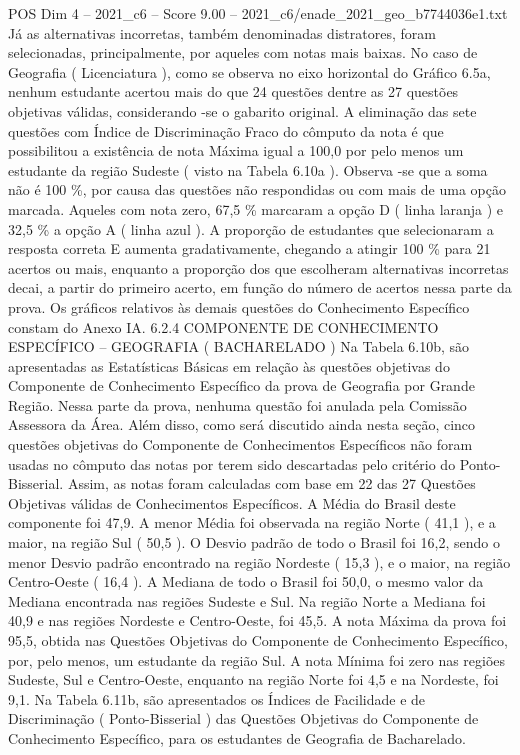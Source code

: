 \begin{textsample}{POS Dim 4 – 2021\_c6 – Score 9.00 – 2021\_c6/enade\_2021\_geo\_b7744036e1.txt}
Já as alternativas incorretas, também denominadas distratores, foram selecionadas, principalmente, por aqueles com notas mais baixas.
No caso de Geografia ( Licenciatura ), como se observa no eixo horizontal do Gráfico 6.5a, nenhum estudante acertou mais do que 24 questões dentre as 27 questões objetivas válidas, considerando -se o gabarito original.
A eliminação das sete questões com Índice de Discriminação Fraco do cômputo da nota é que possibilitou a existência de nota Máxima igual a 100,0 por pelo menos um estudante da região Sudeste ( visto na Tabela 6.10a ).
Observa -se que a soma não é 100 \%, por causa das questões não respondidas ou com mais de uma opção marcada.
Aqueles com nota zero, 67,5 \% marcaram a opção D ( linha laranja ) e 32,5 \% a opção A ( linha azul ).
A proporção de estudantes que selecionaram a resposta correta E aumenta gradativamente, chegando a atingir 100 \% para 21 acertos ou mais, enquanto a proporção dos que escolheram alternativas incorretas decai, a partir do primeiro acerto, em função do número de acertos nessa parte da prova.
Os gráficos relativos às demais questões do Conhecimento Específico constam do Anexo IA. 6.2.4 COMPONENTE DE CONHECIMENTO ESPECÍFICO – GEOGRAFIA ( BACHARELADO ) Na Tabela 6.10b, são apresentadas as Estatísticas Básicas em relação às questões objetivas do Componente de Conhecimento Específico da prova de Geografia por Grande Região.
Nessa parte da prova, nenhuma questão foi anulada pela Comissão Assessora da Área.
Além disso, como será discutido ainda nesta seção, cinco questões objetivas do Componente de Conhecimentos Específicos não foram usadas no cômputo das notas por terem sido descartadas pelo critério do Ponto-Bisserial.
Assim, as notas foram calculadas com base em 22 das 27 Questões Objetivas válidas de Conhecimentos Específicos.
A Média do Brasil deste componente foi 47,9.
A menor Média foi observada na região Norte ( 41,1 ), e a maior, na região Sul ( 50,5 ).
O Desvio padrão de todo o Brasil foi 16,2, sendo o menor Desvio padrão encontrado na região Nordeste ( 15,3 ), e o maior, na região Centro-Oeste ( 16,4 ).
A Mediana de todo o Brasil foi 50,0, o mesmo valor da Mediana encontrada nas regiões Sudeste e Sul.
Na região Norte a Mediana foi 40,9 e nas regiões Nordeste e Centro-Oeste, foi 45,5.
A nota Máxima da prova foi 95,5, obtida nas Questões Objetivas do Componente de Conhecimento Específico, por, pelo menos, um estudante da região Sul.
A nota Mínima foi zero nas regiões Sudeste, Sul e Centro-Oeste, enquanto na região Norte foi 4,5 e na Nordeste, foi 9,1.
Na Tabela 6.11b, são apresentados os Índices de Facilidade e de Discriminação ( Ponto-Bisserial ) das Questões Objetivas do Componente de Conhecimento Específico, para os estudantes de Geografia de Bacharelado.

\end{textsample}
